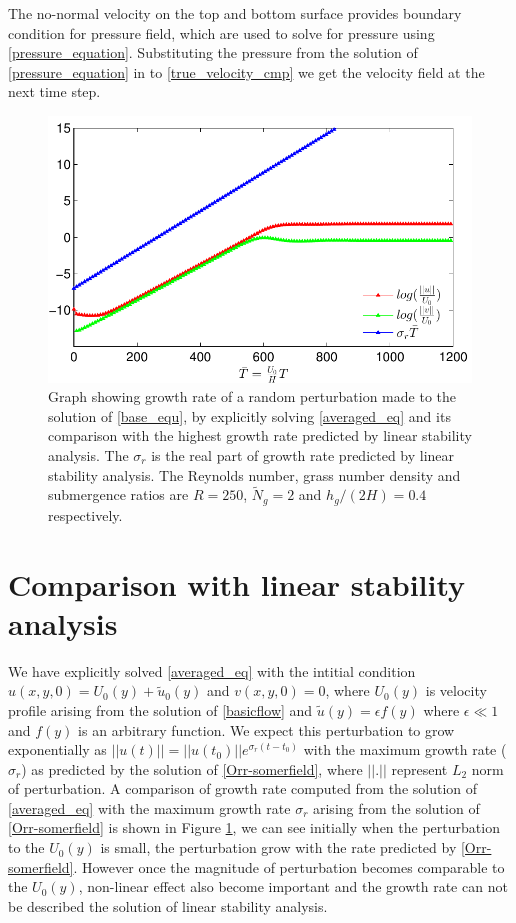 \documentclass[12pt]{report}   %
\newcommand{\Ndg}{\tilde{N}_g}
\begin{document}
The no-normal velocity on the top and bottom surface provides boundary condition for pressure field, which are used to solve for pressure using \eqref{pressure_equation}. Substituting the pressure from the solution of \eqref{pressure_equation} in to \eqref{true_velocity_cmp} we get the velocity field at the next time step. 
\begin{figure}
\centerline{\includegraphics{LinearStabilityVsCFD1} }
\caption{Graph showing growth rate of a random perturbation made to the solution of \eqref{base_equ}, by explicitly solving \eqref{averaged_eq} and its comparison with the highest growth rate predicted by linear stability analysis. The $\sigma_r$ is the real part of growth rate predicted by linear stability analysis. The  Reynolds number, grass number density and submergence ratios are $R=250$, $\Ndg=2$ and $h_{g}/(2H) = 0.4$ respectively.}
\label{CFD_vs_LinearStabilityGrowthRate}
\end{figure}
\section{Comparison with linear stability analysis}
We have explicitly solved \eqref{averaged_eq} with the intitial condition $u(x,y,0) = U_{0}(y)+\tilde{u}_0(y)$ and $v(x,y,0)=0$, where $U_{0}(y)$ is velocity profile arising from the solution of \eqref{basicflow} and $\tilde{u}(y) = \epsilon f(y)$ where $\epsilon \ll 1$ and $f(y)$ is an arbitrary function. We expect this perturbation to grow exponentially as $||u(t)|| = ||u(t_0)|| e^{\sigma_r (t-t_0)}$ with the maximum growth rate ($\sigma_r$) as predicted by the solution of \eqref{Orr-somerfield}, where $||.||$ represent $L_2$ norm of perturbation. A comparison of growth rate computed from the solution of \eqref{averaged_eq} with the
maximum growth rate $\sigma_r$ arising from the solution of \eqref{Orr-somerfield} is shown in Figure \ref{CFD_vs_LinearStabilityGrowthRate}, we can see initially when the perturbation to the $U_0(y)$ is small, the perturbation grow with the rate predicted by \eqref{Orr-somerfield}. However once the magnitude of perturbation becomes comparable to the $U_0(y)$, non-linear effect also become important and the growth rate can not be described the solution of linear stability analysis. 
\end{document}
